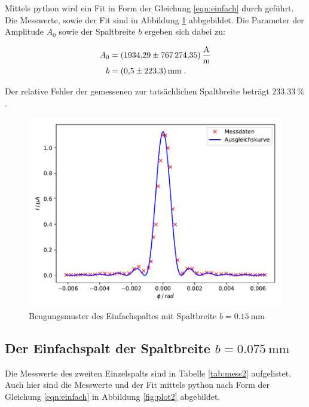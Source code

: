 Mittels python wird ein Fit in Form der Gleichung \eqref{eqn:einfach} durch geführt.
Die Messwerte, sowie der Fit sind in Abbildung \ref{fig:plot1} abbgebildet.
Die Parameter der Amplitude $A_0$ sowie der Spaltbreite $b$ ergeben sich dabei zu:

\begin{align*}
    A_0 &= \SI{1934.29 +- 767274.35}{\ampere\per\meter} \\
    b &= \SI{0.5 +- 223.3}{\milli\meter} \; .
\end{align*}

Der relative Fehler der gemessenen zur tatsächlichen Spaltbreite beträgt $\SI{233.33}{\percent}$.

\begin{figure}
  \centering
  \includegraphics{content/plot1.pdf}
  \caption{Beugungsmuster des Einfachspaltes mit Spaltbreite $b = \SI{0.15}{\milli\meter}$}
  \label{fig:plot1}
\end{figure}


\subsection{Der Einfachspalt der Spaltbreite $b = \SI{0.075}{\milli\meter}$}

Die Messwerte des zweiten Einzelspalts sind in Tabelle \ref{tab:mess2} aufgelistet.
Auch hier sind die Messwerte und der Fit mittels python nach Form der Gleichung \eqref{eqn:einfach}
in Abbildung \ref{fig:plot2} abgebildet.

